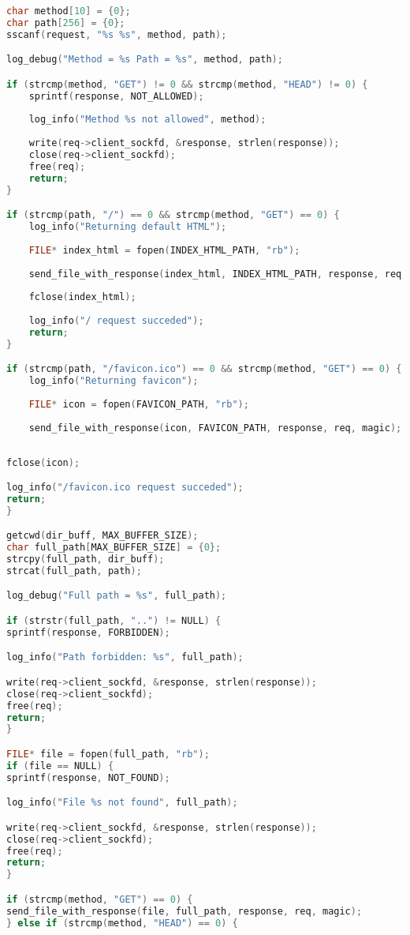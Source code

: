 \begin{lstlisting}[label=lst:s3,caption=Исходный код сервера, language=c]
char method[10] = {0};
char path[256] = {0};
sscanf(request, "%s %s", method, path);

log_debug("Method = %s Path = %s", method, path);

if (strcmp(method, "GET") != 0 && strcmp(method, "HEAD") != 0) {
	sprintf(response, NOT_ALLOWED);
	
	log_info("Method %s not allowed", method);
	
	write(req->client_sockfd, &response, strlen(response));
	close(req->client_sockfd);
	free(req);
	return;
}

if (strcmp(path, "/") == 0 && strcmp(method, "GET") == 0) {
	log_info("Returning default HTML");
	
	FILE* index_html = fopen(INDEX_HTML_PATH, "rb");
	
	send_file_with_response(index_html, INDEX_HTML_PATH, response, req, magic);
	
	fclose(index_html);
	
	log_info("/ request succeded");
	return;
}

if (strcmp(path, "/favicon.ico") == 0 && strcmp(method, "GET") == 0) {
	log_info("Returning favicon");
	
	FILE* icon = fopen(FAVICON_PATH, "rb");
	
	send_file_with_response(icon, FAVICON_PATH, response, req, magic);
\end{lstlisting}

\begin{lstlisting}[label=lst:s4,caption=Исходный код сервера, language=c]
	
fclose(icon);

log_info("/favicon.ico request succeded");
return;
}

getcwd(dir_buff, MAX_BUFFER_SIZE);
char full_path[MAX_BUFFER_SIZE] = {0};
strcpy(full_path, dir_buff);
strcat(full_path, path);

log_debug("Full path = %s", full_path);

if (strstr(full_path, "..") != NULL) {
sprintf(response, FORBIDDEN);

log_info("Path forbidden: %s", full_path);

write(req->client_sockfd, &response, strlen(response));
close(req->client_sockfd);
free(req);
return;
}

FILE* file = fopen(full_path, "rb");
if (file == NULL) {
sprintf(response, NOT_FOUND);

log_info("File %s not found", full_path);

write(req->client_sockfd, &response, strlen(response));
close(req->client_sockfd);
free(req);
return;
}

if (strcmp(method, "GET") == 0) {
send_file_with_response(file, full_path, response, req, magic);
} else if (strcmp(method, "HEAD") == 0) {
\end{lstlisting}

